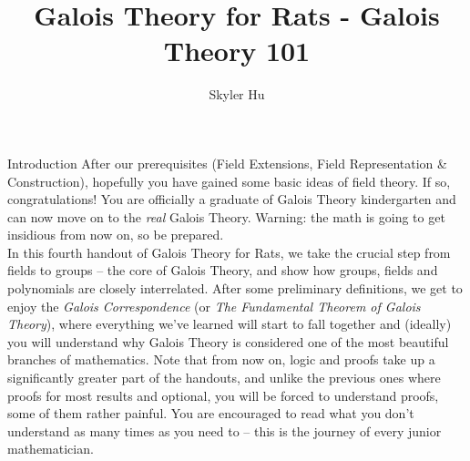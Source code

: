 \documentclass[12pt]{article}
\title{Galois Theory for Rats - Galois Theory 101}
\author{Skyler Hu}
\theoremstyle{definition}
\theoremstyle{definition}
\theoremstyle{definition}
\theoremstyle{definition}
\theoremstyle{definition}
\theoremstyle{definition}
\theoremstyle{definition}
\begin{document}
\linespread{1.05}
\maketitle
\newpage
\tableofcontents
\newpage

\begin{section}{Introduction}
    After our prerequisites (Field Extensions, Field Representation \& Construction), hopefully you have gained some basic ideas of 
    field theory. If so, congratulations! You are officially a graduate of Galois Theory kindergarten and can now move on to the  
    \textit{real} Galois Theory. Warning: the math is going to get insidious from now on, so be prepared.\\
    \break
    In this fourth handout of Galois Theory for Rats, we take the crucial step from fields to groups -- the core of Galois Theory, and 
    show how groups, fields and polynomials are closely interrelated. After some preliminary definitions, we get to enjoy the \textit{Galois 
    Correspondence} (or \textit{The Fundamental Theorem of Galois Theory}), where everything we've learned will start to fall together and 
    (ideally) you will understand why Galois Theory is considered one of the most beautiful branches of mathematics. Note that from now on, 
    logic and proofs take up a significantly greater part of the handouts, and unlike the previous ones where proofs for most results and optional,
    you will be forced to understand proofs, some of them rather painful. You are encouraged to read what you don't understand as many times 
    as you need to -- this is the journey of every junior mathematician.
\end{section}

\newpage
\end{document}
